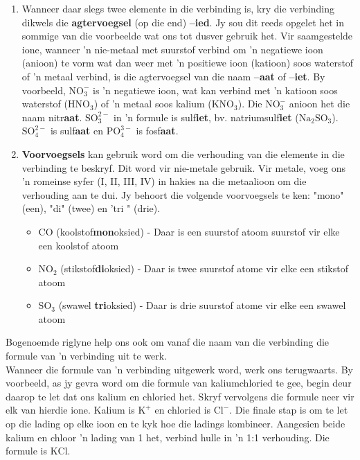 \begin{enumerate}[noitemsep, label=\textbf{\arabic*}. ]
\begin{table}[H]
\begin{center}
 \end{center}
\caption{Tabel van anione}
\label{tab:anions}
\end{table}

    \pagebreak
  \label{m38708*uid42}\item Wanneer daar slegs twee elemente in die verbinding is, kry die verbinding dikwels die \textbf{agtervoegsel} (op die end) \textbf{–ied}. Jy sou dit reeds opgelet het in sommige van die voorbeelde wat ons tot dusver gebruik het. Vir saamgestelde ione, wanneer 'n nie-metaal met suurstof verbind om 'n negatiewe ioon (anioon) te vorm wat dan weer met 'n positiewe ioon (katioon) soos waterstof of 'n metaal verbind, is die agtervoegsel van die naam \textbf{–aat} of \textbf{–iet}. By voorbeeld, $\text{NO}_{3}^{-}$ is 'n negatiewe ioon, wat kan verbind met 'n katioon soos waterstof ($\text{HNO}{}_{3}$) of 'n metaal soos kalium ($\text{KNO}{}_{3}$). Die $\text{NO}_{3}^{-}$ anioon het die naam nitr\textbf{aat}. $\text{SO}_{3}^{2-}$ in 'n formule is sulf\textbf{iet}, bv. natriumsulf\textbf{iet} ($\text{Na}{}_{2}\text{SO}{}_{3}$). $\text{SO}_{4}^{2-}$ is sulf\textbf{aat} en $\text{PO}_{4}^{3-}$ is fosf\textbf{aat}.
\label{m38708*uid43}\item \textbf{Voorvoegsels} kan gebruik word om die verhouding van die elemente in die verbinding te beskryf. Dit word vir nie-metale gebruik. Vir metale, voeg ons 'n romeinse syfer (I, II, III, IV) in hakies na die metaalioon om die verhouding aan te dui. Jy behoort die volgende voorvoegsels te ken: "mono" (een), "di" (twee) en 'tri " (drie).
\label{m38708*id64977}\begin{itemize}[noitemsep]
            \label{m38708*uid44}\item $\text{CO}$ (koolstof\textbf{mon}oksied) - Daar is een suurstof atoom suurstof vir elke een koolstof atoom
\label{m38708*uid45}\item $\text{NO}{}_{2}$ (stikstof\textbf{di}oksied) - Daar is twee suurstof atome vir elke een stikstof atoom
\label{m38708*uid46}\item $\text{SO}{}_{3}$ (swawel \textbf{tri}oksied) - Daar is drie suurstof atome vir elke een swawel atoom
\end{itemize}
        \end{enumerate}
\label{m38708*id537402}Bogenoemde riglyne help ons ook om vanaf die naam van die verbinding die formule van 'n verbinding uit te werk.\\
\label{m38708*eip-178}Wanneer die formule van 'n verbinding uitgewerk word, werk ons terugwaarts. By voorbeeld, as jy gevra word om die formule van kaliumchloried te gee, begin deur daarop te let dat ons kalium en chloried het. Skryf vervolgens die formule neer vir elk van hierdie ione. Kalium is ${\text{K}}^{+}$ en chloried is ${\text{Cl}}^{-}$. Die finale stap is om te let op die lading op elke ioon en te kyk hoe die ladings kombineer. Aangesien beide kalium en chloor 'n lading van 1 het, verbind hulle in 'n 1:1 verhouding. Die formule is $\text{KCl}$.\\ 
